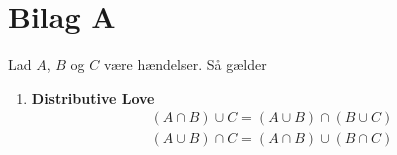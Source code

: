 \section{Bilag A}\label{Distributive love}
\begin{minipage}\textwidth
\begin{lem} \textbf{} %
\newline
Lad $A$, $B$ og $C$ være hændelser. Så gælder
\begin{enumerate}[label=(\textbf{\alph*})]
    \item \textbf{Distributive Love} \begin{align*}
        (A\cap B)\cup C=(A\cup B)\cap(B\cup C)\\
        (A\cup B)\cap C=(A\cap B)\cup(B\cap C)
    \end{align*}
\end{enumerate}
\end{lem}
\end{minipage}